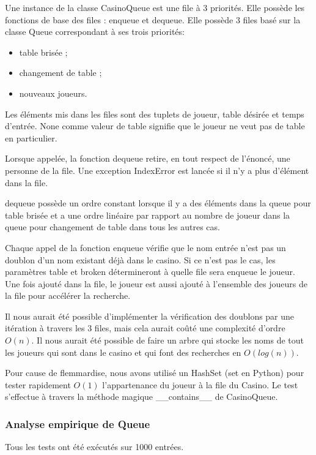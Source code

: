 \documentclass[french]{article}
\begin{document}
Une instance de la classe \textsf{CasinoQueue} est une file à 3 priorités.  Elle
possède les fonctions de base des files : \textsf{enqueue} et \textsf{dequeue}.
Elle possède 3 files basé sur la classe \textsf{Queue} correspondant à ses trois
priorités:
\begin{itemize}
\item table brisée ;
\item changement de table ;
\item nouveaux joueurs.
\end{itemize}

Les éléments mis dans les files sont des tuplets de joueur, table désirée et
temps d'entrée. \textsf{None} comme valeur de table signifie que le joueur ne
veut pas de table en particulier.

Lorsque appelée, la fonction \textsf{dequeue} retire, en tout respect de
l'énoncé, une personne de la file. Une exception \textsf{IndexError} est lancée
si il n'y a plus d'élément dans la file.

\textsf{dequeue} possède un ordre constant lorsque il y a des éléments
dans la queue pour table brisée et a une ordre linéaire par rapport au nombre de
joueur dans la queue pour changement de table dans tous les autres cas.

Chaque appel de la fonction \textsf{enqueue} vérifie que le nom entrée n'est pas
un doublon d'un nom existant déjà dans le casino. Si ce n'est pas le cas, les
paramètres \textsf{table} et \textsf{broken} détermineront à quelle file sera
enqueue le joueur. Une fois ajouté dans la file, le joueur est aussi ajouté à
l'ensemble des joueurs de la file pour accélérer la recherche.

Il nous aurait été possible d'implémenter la vérification des doublons par une
itération à travers les 3 files, mais cela aurait coûté une complexité d'ordre
$O(n)$. Il nous aurait été possible de faire un arbre qui stocke les noms de
tout les joueurs qui sont dans le casino et qui font des recherches en 
$O(log(n))$.

Pour cause de flemmardise, nous avons utilisé un \textsf{HashSet} (\textsf{set}
en Python) pour tester rapidement $O(1)$ l'appartenance du joueur à la file du
Casino. Le test s'effectue à travers la méthode magique
\textsf{\_\_contains\_\_} de \textsf{CasinoQueue}.

\subsubsection{Analyse empirique de \textsf{Queue}}
Tous les tests ont été exécutés sur 1000 entrées.
\end{document}
